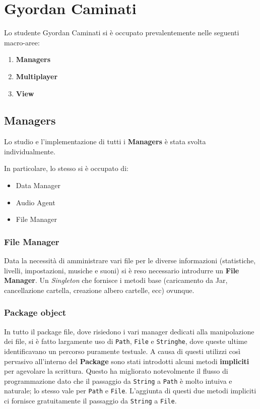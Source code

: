 \section{Gyordan Caminati}

Lo studente Gyordan Caminati si è occupato prevalentemente nelle seguenti macro-aree:

\begin{enumerate}
    \item \textbf{Managers}
    \item \textbf{Multiplayer}
    \item \textbf{View}
\end{enumerate}

\subsection{Managers}
    Lo studio e l'implementazione di tutti i \textbf{Managers} è stata svolta individualmente.
    
    In particolare, lo stesso si è occupato di:
    
    \begin{itemize}
        \item Data Manager
	    \item Audio Agent
	    \item File Manager
    \end{itemize}
    
    \subsubsection{File Manager}
    Data la necessità di amministrare vari file per le diverse informazioni (statistiche, livelli, impostazioni, musiche 
    e suoni) si è reso necessario introdurre un \textbf{File Manager}.
    Un \textit{Singleton} che fornisce i metodi base (caricamento da Jar, cancellazione cartella, creazione albero cartelle, ecc) ovunque.
        
    \subsubsection{Package object}
    In tutto il package file, dove risiedono i vari manager dedicati alla manipolazione dei file, si è fatto largamente uso di
    \texttt{Path}, \texttt{File} e \texttt{Stringhe}, dove queste ultime identificavano un percorso puramente testuale.
    A causa di questi utilizzi così pervasivo all'interno del \textbf{Package} sono stati introdotti alcuni metodi \textbf{impliciti} per agevolare la scrittura.
    Questo ha migliorato notevolmente il flusso di programmazione dato che il passaggio da \texttt{String} a \texttt{Path} è molto intuiva e naturale; lo stesso vale per \texttt{Path} e \texttt{File}.
    L'aggiunta di questi due metodi impliciti ci fornisce gratuitamente il passaggio da \texttt{String} a \texttt{File}.
    
